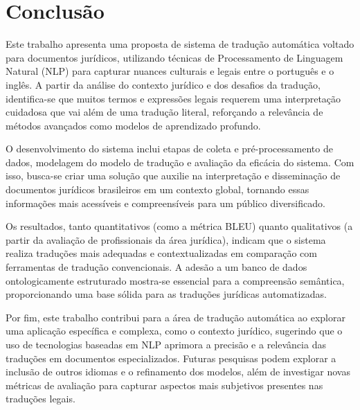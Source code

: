\chapter{Conclusão}

Este trabalho apresenta uma proposta de sistema de tradução automática voltado para documentos jurídicos, utilizando técnicas de Processamento de Linguagem Natural (NLP) para capturar nuances culturais e legais entre o português e o inglês. A partir da análise do contexto jurídico e dos desafios da tradução, identifica-se que muitos termos e expressões legais requerem uma interpretação cuidadosa que vai além de uma tradução literal, reforçando a relevância de métodos avançados como modelos de aprendizado profundo.

O desenvolvimento do sistema inclui etapas de coleta e pré-processamento de dados, modelagem do modelo de tradução e avaliação da eficácia do sistema. Com isso, busca-se criar uma solução que auxilie na interpretação e disseminação de documentos jurídicos brasileiros em um contexto global, tornando essas informações mais acessíveis e compreensíveis para um público diversificado.

Os resultados, tanto quantitativos (como a métrica BLEU) quanto qualitativos (a partir da avaliação de profissionais da área jurídica), indicam que o sistema realiza traduções mais adequadas e contextualizadas em comparação com ferramentas de tradução convencionais. A adesão a um banco de dados ontologicamente estruturado mostra-se essencial para a compreensão semântica, proporcionando uma base sólida para as traduções jurídicas automatizadas.

Por fim, este trabalho contribui para a área de tradução automática ao explorar uma aplicação específica e complexa, como o contexto jurídico, sugerindo que o uso de tecnologias baseadas em NLP aprimora a precisão e a relevância das traduções em documentos especializados. Futuras pesquisas podem explorar a inclusão de outros idiomas e o refinamento dos modelos, além de investigar novas métricas de avaliação para capturar aspectos mais subjetivos presentes nas traduções legais.

